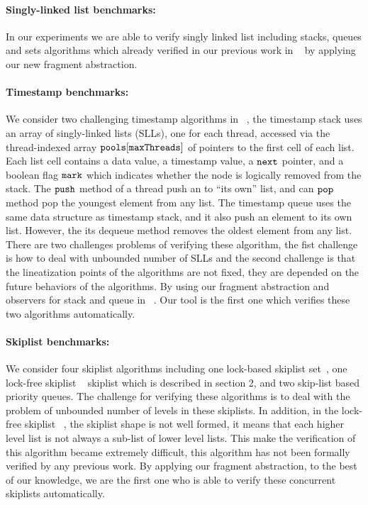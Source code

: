 \paragraph{Singly-linked list benchmarks:} In our experiments we are able to verify singly linked list including stacks, queues and sets algorithms which already verified in our previous work in ~\cite{Quy:sas16} by applying our new fragment abstraction.
\paragraph{Timestamp benchmarks:} We consider two challenging timestamp algorithms in ~\cite{ts-stack}, the timestamp stack uses an array of singly-linked lists (SLLs), one for each thread, accessed via the thread-indexed array ${\tt pools[maxThreads]}$ of pointers to the first cell of each list. Each list cell contains a data value, a timestamp value, a ${\tt next}$ pointer, and a boolean flag ${\tt mark}$ which indicates whether the node is logically removed from the stack. The $\tt push$ method of a thread push an to ``its own'' list, and can $\tt pop$ method pop the youngest element from any list. The timestamp queue uses the same data structure as timestamp stack, and it also push an element to its own list. However, the its dequeue method removes the oldest element from any list. There are two challenges problems of verifying these algorithm, the fist challenge is how to deal with unbounded number of SLLs and the second challenge is that the lineatization points of the algorithms are not fixed, they are depended on the future behaviors of the algorithms. By using our fragment abstraction and observers for stack and queue in ~\cite{BEEH:icalp15}. Our tool is the first one which verifies these two algorithms automatically.

\paragraph{Skiplist benchmarks:} We consider four skiplist algorithms including one lock-based skiplist set~\cite{MS:QueueAlgorithms}, one lock-free skiplist ~\cite{ArtOfMpP} skiplist which is described in section 2, and two skip-list based priority queues. The challenge for verifying these algorithms is to deal with the problem of unbounded number of levels in these skiplists. In addition, in the lock-free skiplist ~\cite{ArtOfMpP}, the skiplist shape is not well formed, it means that each higher level list is not always a sub-list of lower level lists. This make the verification of this algorithm became extremely difficult, this algorithm has not been formally verified by any previous work. By applying our fragment abstraction,  to the best of our knowledge, we are the first one who is able to verify these concurrent skiplists automatically. 



